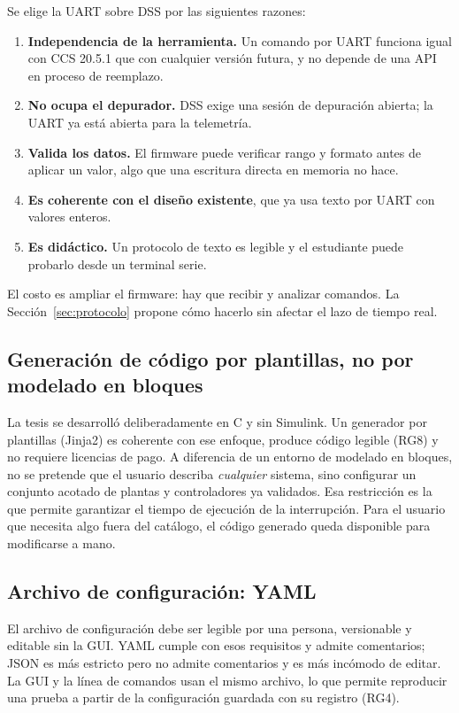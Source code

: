 \documentclass[12pt,letterpaper]{article}
\begin{document}
Se elige la UART sobre DSS por las siguientes razones:
\begin{enumerate}
    \item \textbf{Independencia de la herramienta.} Un comando por UART funciona igual con CCS 20.5.1 que con cualquier versión futura, y no depende de una API en proceso de reemplazo.
    \item \textbf{No ocupa el depurador.} DSS exige una sesión de depuración abierta; la UART ya está abierta para la telemetría.
    \item \textbf{Valida los datos.} El firmware puede verificar rango y formato antes de aplicar un valor, algo que una escritura directa en memoria no hace.
    \item \textbf{Es coherente con el diseño existente}, que ya usa texto por UART con valores enteros.
    \item \textbf{Es didáctico.} Un protocolo de texto es legible y el estudiante puede probarlo desde un terminal serie.
\end{enumerate}
El costo es ampliar el firmware: hay que recibir y analizar comandos. La Sección~\ref{sec:protocolo} propone cómo hacerlo sin afectar el lazo de tiempo real.

\subsection{Generación de código por plantillas, no por modelado en bloques}
\label{sec:dec_generador}

La tesis se desarrolló deliberadamente en C y sin Simulink. Un generador por plantillas (Jinja2) es coherente con ese enfoque, produce código legible (RG8) y no requiere licencias de pago. A diferencia de un entorno de modelado en bloques, no se pretende que el usuario describa \emph{cualquier} sistema, sino configurar un conjunto acotado de plantas y controladores ya validados. Esa restricción es la que permite garantizar el tiempo de ejecución de la interrupción. Para el usuario que necesita algo fuera del catálogo, el código generado queda disponible para modificarse a mano.

\subsection{Archivo de configuración: YAML}

El archivo de configuración debe ser legible por una persona, versionable y editable sin la GUI. YAML cumple con esos requisitos y admite comentarios; JSON es más estricto pero no admite comentarios y es más incómodo de editar. La GUI y la línea de comandos usan el mismo archivo, lo que permite reproducir una prueba a partir de la configuración guardada con su registro (RG4).
\end{document}
